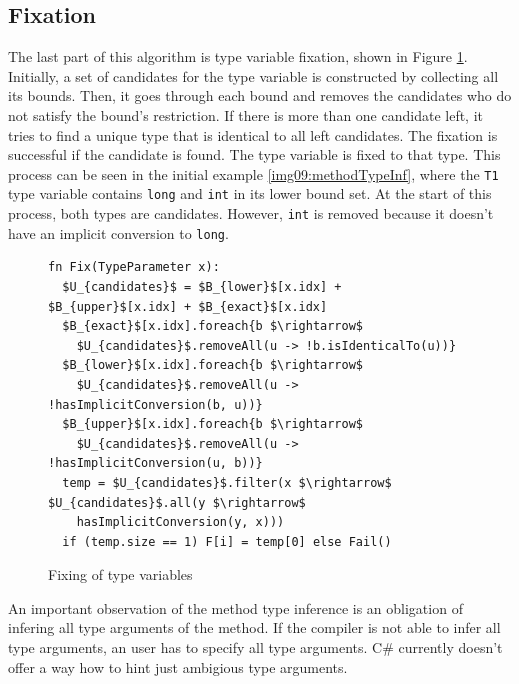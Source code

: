 \subsection{Fixation}

The last part of this algorithm is type variable fixation, shown in Figure \ref{img13:methodTypeInference4}. 
Initially, a set of candidates for the type variable is constructed by collecting all its bounds.
Then, it goes through each bound and removes the candidates who do not satisfy the bound’s restriction. 
If there is more than one candidate left, it tries to find a unique type that is identical to all left candidates. 
The fixation is successful if the candidate is found. 
The type variable is fixed to that type. 
This process can be seen in the initial example \ref{img09:methodTypeInf}, where the \texttt{T1} type variable contains \texttt{long} and \texttt{int} in its lower bound set. 
At the start of this process, both types are candidates. 
However, \texttt{int} is removed because it doesn’t have an implicit conversion to \texttt{long}.
\par
\begin{figure}[h!]
\begin{lstlisting}[style=myAlgo, mathescape=true]
fn Fix(TypeParameter x):
  $U_{candidates}$ = $B_{lower}$[x.idx] + $B_{upper}$[x.idx] + $B_{exact}$[x.idx]
  $B_{exact}$[x.idx].foreach{b $\rightarrow$ 
    $U_{candidates}$.removeAll(u -> !b.isIdenticalTo(u))}
  $B_{lower}$[x.idx].foreach{b $\rightarrow$ 
    $U_{candidates}$.removeAll(u -> !hasImplicitConversion(b, u))}
  $B_{upper}$[x.idx].foreach{b $\rightarrow$ 
    $U_{candidates}$.removeAll(u -> !hasImplicitConversion(u, b))}
  temp = $U_{candidates}$.filter(x $\rightarrow$ $U_{candidates}$.all(y $\rightarrow$ 
    hasImplicitConversion(y, x)))
  if (temp.size == 1) F[i] = temp[0] else Fail()
\end{lstlisting}
\caption{Fixing of type variables}
\label{img13:methodTypeInference4}
\end{figure}
\par
An important observation of the method type inference is an obligation of infering all type arguments of the method.
If the compiler is not able to infer all type arguments, an user has to specify all type arguments.
C\# currently doesn't offer a way how to hint just ambigious type arguments.